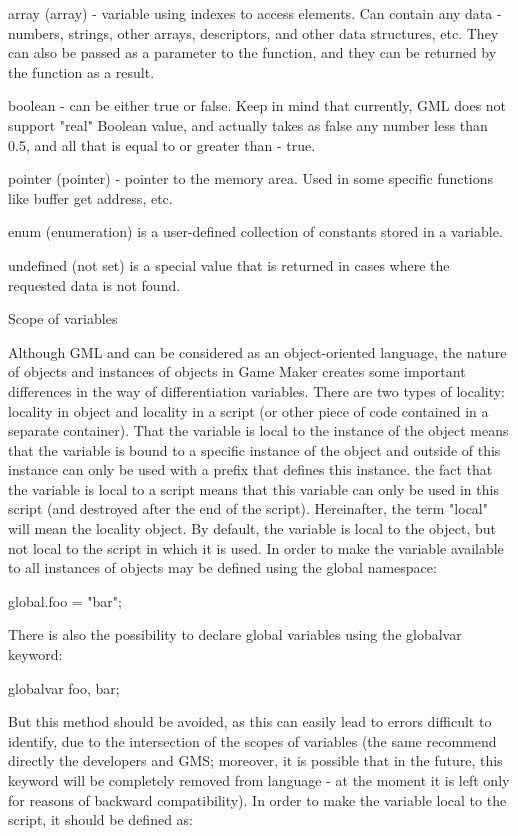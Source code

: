 \documentclass[12pt]{article}
\begin{document}
array (array) - variable using indexes to access elements. Can contain any data - numbers, strings, other arrays, descriptors, and other data structures, etc. They can also be passed as a parameter to the function, and they can be returned by the function as a result.{}

boolean - can be either true or false. Keep in mind that currently, GML does not support "real" Boolean value, and actually takes as false any number less than 0.5, and all that is equal to or greater than - true.{}

pointer (pointer) - pointer to the memory area. Used in some specific functions like buffer get address, etc.{}

enum (enumeration) is a user-defined collection of constants stored in a variable.{}

undefined (not set) is a special value that is returned in cases where the requested data is not found.{}

Scope of variables{}

Although GML and can be considered as an object-oriented language, the nature of objects and instances of objects in Game Maker creates some important differences in the way of differentiation variables. There are two types of locality: locality in object and locality in a script (or other piece of code contained in a separate container). That the variable is local to the instance of the object means that the variable is bound to a specific instance of the object and outside of this instance can only be used with a prefix that defines this instance. the fact that the variable is local to a script means that this variable can only be used in this script (and destroyed after the end of the script). Hereinafter, the term "local" will mean the locality object. By default, the variable is local to the object, but not local to the script in which it is used. In order to make the variable available to all instances of objects may be defined using the global namespace:{}

global.foo = "bar";{}

There is also the possibility to declare global variables using the globalvar keyword:{}

globalvar foo, bar;{}

But this method should be avoided, as this can easily lead to errors difficult to identify, due to the intersection of the scopes of variables (the same recommend directly the developers and GMS; moreover, it is possible that in the future, this keyword will be completely removed from language - at the moment it is left only for reasons of backward compatibility). In order to make the variable local to the script, it should be defined as:{}
\end{document}
